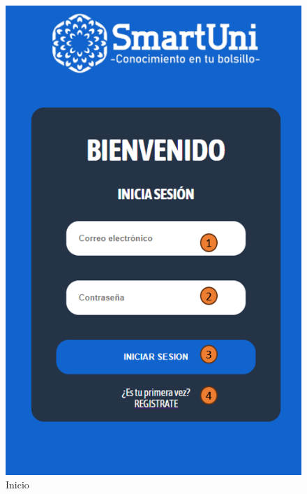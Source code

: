 \documentclass[12pt]{report}
\begin{document}
\begin{appendices}
\begin{figure}[H]
    \includegraphics[scale = 0.7]{imagenes//manual_de_usuario/1.png}
    \caption{Inicio}
    \label{fig:Figura3.4.3}
\end{figure}
\newpage

\end{appendices}
\end{document}

